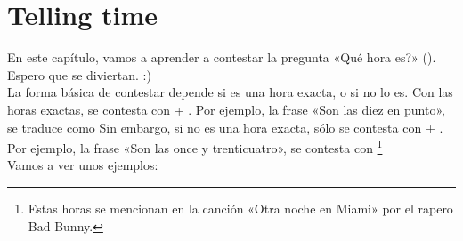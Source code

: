 \chapter{Telling time}

En este cap\'itulo, vamos a aprender a contestar la pregunta «\textquestiondown Qu\'e hora es?» ().
Espero que se diviertan. :) \\

La forma b\'asica de contestar depende si es una hora exacta, o si no lo es.
Con las horas exactas, se contesta con  + .
Por ejemplo, la frase «Son las diez en punto», se traduce como 
Sin embargo, si no es una hora exacta, s\'olo se contesta con  + .
Por ejemplo, la frase «Son las once y trenticuatro», se contesta con \footnote{Estas horas se mencionan en la canci\'on «Otra noche en Miami» por el rapero Bad Bunny.} \\

Vamos a ver unos ejemplos:

